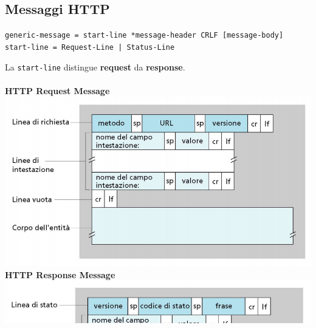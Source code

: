 \documentclass[10pt]{article}
\begin{document}
\subsection{Messaggi HTTP}
\begin{center}
\texttt{generic-message = start-line *message-header CRLF [message-body]\\
start-line = Request-Line | Status-Line}
\end{center}
La \texttt{start-line} distingue \textbf{request} da \textbf{response}.\\\\
\textbf{HTTP Request Message}\\
\includegraphics[scale=0.75]{httpmessage.png}\\
\textbf{HTTP Response Message}\\
\includegraphics[scale=0.75]{httpresponse.png}
\pagebreak
\end{document}
